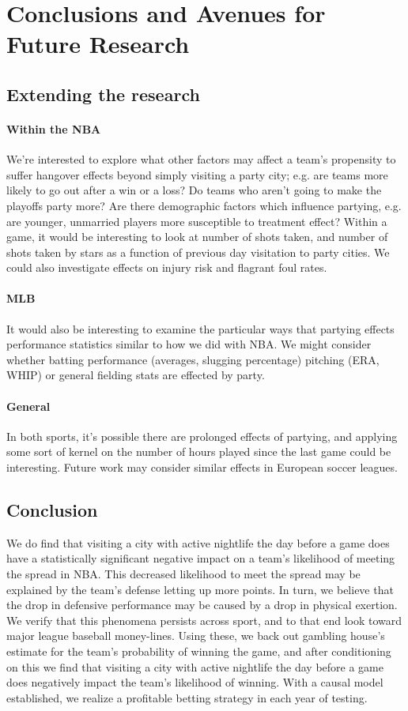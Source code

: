 \documentclass[letterpaper,12pt]{article}
\begin{document}
\section{Conclusions and Avenues for Future Research}
\subsection{Extending the research}
\paragraph{Within the NBA} 
We're interested to explore what other factors may affect a team's propensity to suffer hangover effects beyond simply visiting a party city; e.g. are teams more likely to go out after
a win or a loss? Do teams who aren't going to make the playoffs party more? Are there demographic
factors which influence partying, e.g. are younger, unmarried players more susceptible to treatment effect? Within a game, it would be interesting to look at 
number of shots taken, and number of shots taken by 
stars as a function of previous day visitation to party cities. We could also investigate 
effects on injury risk and flagrant foul rates.

\paragraph{MLB}
It would also be interesting to examine the particular ways that partying
effects performance statistics similar to how we did with NBA.
We might consider whether batting performance (averages, slugging percentage)
pitching (ERA, WHIP) or general fielding stats are effected by party.

\paragraph{General}
In both sports, it's possible there are prolonged effects of partying, and applying some sort of kernel on the number of hours played since the last game could be interesting. 
Future work may consider similar effects in European soccer leagues.

\subsection{Conclusion}
We do find that visiting a city with active nightlife the day before a game does have 
a statistically significant negative impact on a team's likelihood of meeting the spread in NBA. This decreased likelihood to meet the spread may be explained 
by the team's defense letting up more points. In turn, we believe that the drop in
defensive performance may be caused by a drop in physical exertion.
We verify that this phenomena persists across sport, and 
to that end look toward major league baseball money-lines. Using these, we back out gambling
house's estimate for the team's probability of winning the game, and after conditioning on this
we find that visiting a city with active nightlife the day before a game does negatively 
impact the team's likelihood of winning.
With a causal model established, we realize a profitable betting strategy in each year of testing.
\end{document}
